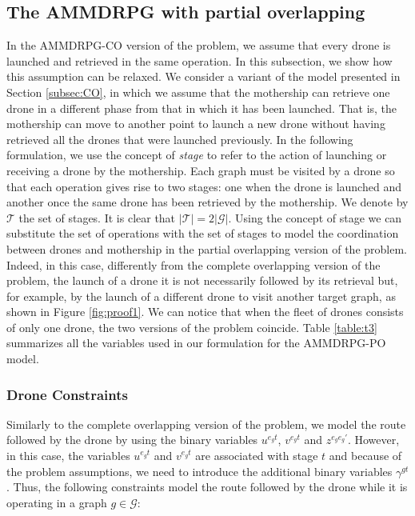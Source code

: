 \documentclass[10pt,a4paper]{elsarticle}
\def\AMDCO{{\sf AMMDRPG-CO\xspace}}
\def\AMDPO{{\sf AMMDRPG-PO\xspace}}
\newcommand{\EN}[1]{{\color{black}#1}}
\begin{document}
\subsection{The AMMDRPG with partial overlapping }\label{amdasyn}
\noindent
In the \AMDCO\xspace version of the problem, we assume that every drone is launched and retrieved in the same operation. In this subsection, we show how this assumption can be relaxed.
We consider a variant of the model presented in Section \ref{subsec:CO}, in which we assume that the mothership can retrieve one drone in a different phase from \EN{that} in which it has been launched. That is, the mothership can move to another point to launch a new drone without having  retrieved all the drones that were launched \EN{previously}.
\noindent
In the following formulation\EN{,} we use the concept of \textit{stage} to refer to the action of launching or receiving a drone \EN{by} the mothership. Each graph must be visited by a drone so that each operation gives rise to two stages: one when the drone is launched and another once the same drone \EN{has been} retrieved by the mothership. We denote by $\mathcal{T}$ the set of stages. It is clear that $|\mathcal{T}|=2|\mathcal{G}|$. Using the concept of stage we can substitute the set of operations with the set of stages to model the coordination between drones and mothership in the partial overlapping version of the problem. Indeed, in this case, differently from the complete overlapping version of the problem, the launch of a drone it is not necessarily followed by its retriev\EN{al} but, for example, by the launch of a different drone to visit another target graph, \EN{as} shown in Figure \ref{fig:proof1}. 
We can notice that when the fleet of drones consists of only one drone, the two versions of the problem coincide.
Table \ref{table:t3} summarizes all the variables used in our formulation for the \AMDPO\xspace model.



\subsubsection*{Drone Constraints}
\noindent
Similarly to the complete overlapping version of the problem, we model the route followed by the drone by using the binary variables $u^{e_g t}$, $v^{e_g t}$ and $z^{e_g e_g'}$. However, in this case, the variables $u^{e_g t}$ and $v^{e_g t}$ are associated  with stage $t$ and because of the problem assumptions, we need to introduce the additional binary variables $\gamma^{gt}$ . 
Thus, the following constraints model the route followed by the drone while it is operating in a graph $g\in \mathcal G$:
\end{document}
